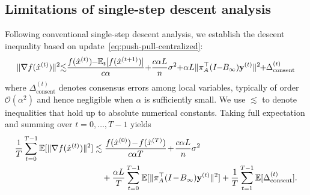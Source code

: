 \documentclass[10pt]{article}
\newcommand{\one}{\mathds{1}_n}
\newcommand{\vx}{{\mathbf{x}}}
\newcommand{\vy}{{\mathbf{y}}}
\newcommand{\EE}{\mathbb{E}}
\newcommand{\norm}[1]{\| #1 \|}
\begin{document}
\subsection{Limitations of single-step descent analysis}\label{sec-limitation}
Following conventional single-step descent analysis, we establish the descent inequality based on update~\eqref{eq:push-pull-centralized}:
\begin{align}\label{ieq:1-step descent}
    \norm{\nabla f(\hat{x}^{(t)})}^2 
    \hspace{-1mm}\lesssim\hspace{-1mm} \frac{f(\hat{x}^{(t)}) \hspace{-1mm}-\hspace{-1mm}\EE_t[f(\hat{x}^{(t+1)})]}{c\alpha}\hspace{-0.8mm}+\hspace{-0.8mm}\frac{c\alpha L}{n}\sigma^2 \hspace{-0.8mm}+\hspace{-0.8mm} \alpha L \norm{\pi_A^\top(I\hspace{-1mm}-\hspace{-1mm}B_\infty)\vy^{(t)}}^2 \hspace{-1mm}+\hspace{-1mm} \Delta_{\text{consent}}^{(t)}
\end{align}
where $\Delta_{\text{consent}}^{(t)}$ denotes consensus errors among local variables, typically of order $\mathcal{O}(\alpha^2)$ and hence negligible when $\alpha$ is sufficiently small. We 
use $\lesssim$ to denote inequalities that hold up to absolute numerical constants. Taking full expectation and summing over $t=0,\dots,T-1$ yields
\begin{align}\label{ieq:1-step corrolary}
     \frac{1}{T}\sum_{t=0}^{T-1}\EE[\norm{\nabla f(\hat{x}^{(t)})}^2] &\lesssim \frac{f(\hat{x}^{(0)})\hspace{-0.5mm}-\hspace{-0.5mm}f(\hat{x}^{(T)})}{c\alpha T} \hspace{-0.5mm}+\hspace{-0.5mm} \frac{c\alpha L}{n}\sigma^2 \hspace{-0.5mm}\hspace{-0.5mm} \\
    &\quad +\frac{\alpha L}{T}\sum_{t=0}^{T-1}\EE[\norm{\pi_A^\top(I\hspace{-0.5mm}-\hspace{-0.5mm}B_\infty)\vy^{(t)}}^2] +\frac{1}{T}\sum_{t=1}^{T-1}\mathbb{E}[\Delta^{(t)}_{\rm consent}]. \label{eq-classical-approach}
\end{align}
\end{document}
